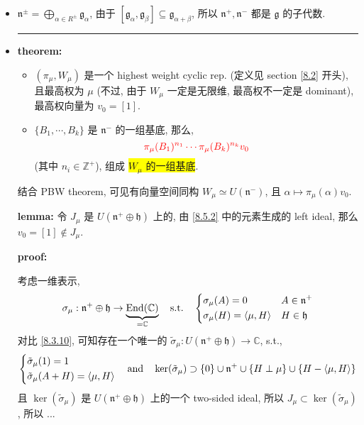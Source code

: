 \begin{itemize}
	\item $\mathfrak{n}^\pm = \bigoplus_{\alpha \in R^\pm} \mathfrak{g}_\alpha$, 由于 $[\mathfrak{g}_\alpha, \mathfrak{g}_\beta] \subseteq \mathfrak{g}_{\alpha + \beta}$, 所以 $\mathfrak{n}^+, \mathfrak{n}^-$ 都是 $\mathfrak{g}$ 的子代数.
	
	\noindent\rule[0.5ex]{\linewidth}{0.5pt} %
	
	\item \textbf{theorem:}
	\begin{itemize}
		\item $(\pi_\mu, W_\mu)$ 是一个 highest weight cyclic rep. (定义见 section \ref{8.2} 开头), 且最高权为 $\mu$ (不过, 由于 $W_\mu$ 一定是无限维, 最高权不一定是 dominant), 最高权向量为 $v_0 = [1]$.
		
		\item $\{B_1, \cdots, B_k\}$ 是 $\mathfrak{n}^-$ 的一组基底, 那么,
		\begin{equation} \label{8.5.7}
			\mathcolor{red}{\pi_\mu(B_1)^{n_1} \cdots \pi_\mu(B_k)^{n_k} v_0}
		\end{equation}
		(其中 $n_i \in \mathbb{Z}^+$), 组成 \colorbox{yellow}{$W_\mu$ 的一组基底}.
	\end{itemize}
	结合 PBW theorem, 可见有向量空间同构 $W_\mu \simeq U(\mathfrak{n}^-)$, 且 $\alpha \mapsto \pi_\mu(\alpha) v_0$.
	
	\begin{tcolorbox}[title=proof:]
		\textbf{lemma:} 令 $J_\mu$ 是 $U(\mathfrak{n}^+ \oplus \mathfrak{h})$ 上的, 由 \eqref{8.5.2} 中的元素生成的 left ideal, 那么 $v_0 = [1] \notin J_\mu$.
		
		\noindent\hdashrule[0.5ex]{\linewidth}{0.5pt}{1mm} %
		
		\textbf{proof:}
		
		考虑一维表示,
		\begin{equation}
			\sigma_\mu : \mathfrak{n}^+ \oplus \mathfrak{h} \rightarrow \underbrace{\mathrm{End}(\mathbb{C})}_{= \mathbb{C}} \quad \text{s.t.} \quad \begin{dcases}
				\sigma_\mu(A) = 0 & A \in \mathfrak{n}^+ \\
				\sigma_\mu(H) = \braket{\mu, H} & H \in \mathfrak{h}
			\end{dcases}
		\end{equation}
		对比 \eqref{8.3.10}, 可知存在一个唯一的 $\tilde{\sigma}_\mu : U(\mathfrak{n}^+ \oplus \mathfrak{h}) \rightarrow \mathbb{C}$, s.t.,
		\begin{equation}
			\begin{dcases}
				\tilde{\sigma}_\mu(1) = 1 \\
				\tilde{\sigma}_\mu(A + H) = \braket{\mu, H}
			\end{dcases} \quad \text{and} \quad \ker(\tilde{\sigma}_\mu) \supset \{0\} \cup \mathfrak{n}^+ \cup \{H \perp \mu\} \cup \{H - \braket{\mu, H}\}
		\end{equation}
		且 $\ker(\tilde{\sigma}_\mu)$ 是 $U(\mathfrak{n}^+ \oplus \mathfrak{h})$ 上的一个 two-sided ideal, 所以 $J_\mu \subset \ker(\tilde{\sigma}_\mu)$, 所以 ...
		

\end{tcolorbox}
\end{itemize}
